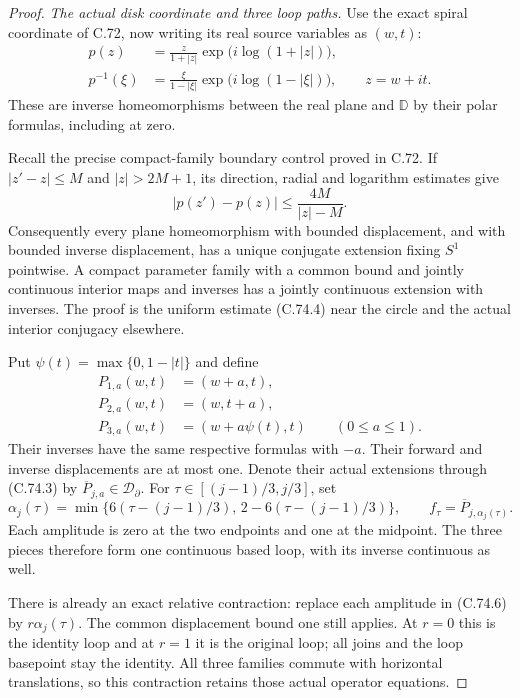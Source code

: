 \begin{proof}
\emph{The actual disk coordinate and three loop paths.}
Use the exact spiral coordinate of C.72, now
writing its real source variables as $(w,t)$:
\[
 \begin{split}
 p(z)&=\frac{z}{1+|z|}
                    \exp\bigl(i\log(1+|z|)\bigr),\\
 p^{-1}(\xi)&=\frac{\xi}{1-|\xi|}
                    \exp\bigl(i\log(1-|\xi|)\bigr),
                    \qquad z=w+it .
 \end{split}                                                   \tag{C.74.3}
\]
These are inverse homeomorphisms between the
real plane and $\mathbb D$ by their polar
formulas, including at zero.

Recall the precise compact-family boundary
control proved in C.72. If $|z'-z|\leq M$ and
$|z|>2M+1$, its direction, radial and logarithm
estimates give
\[
                  |p(z')-p(z)|\leq
                              \frac{4M}{|z|-M}.         \tag{C.74.4}
\]
Consequently every plane homeomorphism with
bounded displacement, and with bounded inverse
displacement, has a unique conjugate extension
fixing $S^1$ pointwise. A compact parameter
family with a common bound and jointly
continuous interior maps and inverses has a
jointly continuous extension with inverses.
The proof is the uniform estimate (C.74.4)
near the circle and the actual interior
conjugacy elsewhere.

Put $\psi(t)=\max\{0,1-|t|\}$ and define
\[
 \begin{split}
 P_{1,a}(w,t)&=(w+a,t),\\
 P_{2,a}(w,t)&=(w,t+a),\\
 P_{3,a}(w,t)&=(w+a\psi(t),t)
                         \qquad(0\leq a\leq1).
 \end{split}                                                   \tag{C.74.5}
\]
Their inverses have the same respective
formulas with $-a$. Their forward and inverse
displacements are at most one. Denote their
actual extensions through (C.74.3) by
$\overline P_{j,a}\in\mathcal D_\partial$.
For $\tau\in[(j-1)/3,j/3]$, set
\[
 \alpha_j(\tau)=
   \min\{6(\tau-(j-1)/3),\,2-6(\tau-(j-1)/3)\},
 \qquad
 f_\tau=\overline P_{j,\alpha_j(\tau)}.                \tag{C.74.6}
\]
Each amplitude is zero at the two endpoints
and one at the midpoint. The three pieces
therefore form one continuous based loop,
with its inverse continuous as well.

There is already an exact relative contraction:
replace each amplitude in (C.74.6) by
$r\alpha_j(\tau)$. The common displacement
bound one still applies. At $r=0$ this is
the identity loop and at $r=1$ it is the
original loop; all joins and the loop
basepoint stay the identity. All three
families commute with horizontal
translations, so this contraction retains
those actual operator equations.


\end{proof}
